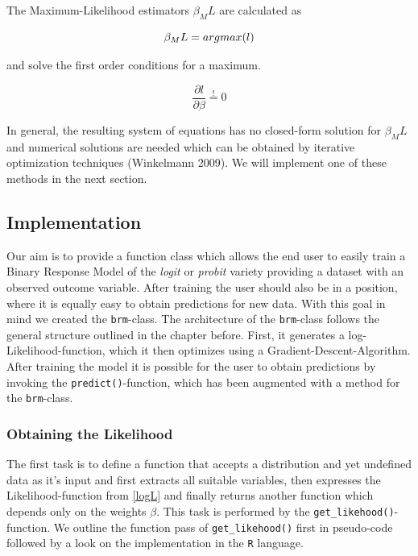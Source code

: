 \documentclass{article}
\begin{document}
The Maximum-Likelihood estimators $\beta_ML$ are calculated as

\begin{equation}
\beta_ML = argmax(l) \\
\end{equation}

and solve the first order conditions for a maximum.

\begin{equation}
\frac{\partial l}{\partial \beta} \stackrel{!}{=} 0
\end{equation}

In general, the resulting system of equations has no closed-form solution for $\beta_ML$ and numerical solutions are needed which can be obtained by iterative optimization techniques (Winkelmann 2009). We will implement one of these methods in the next section.

\subsection{Implementation}

Our aim is to provide a function class which allows the end user to easily train a Binary Response Model of the \textit{logit} or \textit{probit} variety providing a dataset with an observed outcome variable. After training the user should also be in a position, where it is equally easy to obtain predictions for new data. With this goal in mind we created the \texttt{brm}-class. The architecture of the \texttt{brm}-class follows the general structure outlined in the chapter before. First, it generates a log-Likelihood-function, which it then optimizes using a Gradient-Descent-Algorithm. After training the model it is possible for the user to  obtain predictions by invoking the \texttt{predict()}-function, which has been augmented with a method for the \texttt{brm}-class.

\subsubsection{Obtaining the Likelihood}

The first task is to define a function that accepts a distribution and yet undefined data as it's input and first extracts all suitable variables, then expresses the Likelihood-function from \ref{logL} and finally returns another function which depends only on the weights $\beta$. This task is performed by the \texttt{get\_likehood()}-function. We outline the function pass of \texttt{get\_likehood()} first in pseudo-code followed by a look on the implementation in the \texttt{R} language.
\end{document}
